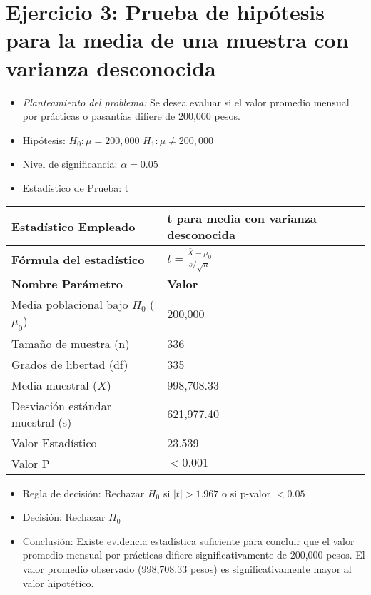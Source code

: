 \documentclass[12pt,a4paper]{article}
\begin{document}
\section*{Ejercicio 3: Prueba de hipótesis para la media de una muestra con varianza desconocida}
\begin{itemize}
    \item \textit{Planteamiento del problema:} Se desea evaluar si el valor promedio mensual por prácticas o pasantías difiere de 200,000 pesos.
    \item Hipótesis: \quad $H_{0}: \mu = 200,000$ \hspace{2cm} $H_{1}: \mu \neq 200,000$
    \item Nivel de significancia: $\alpha = 0.05$
    \item Estadístico de Prueba: t
\end{itemize}

\begin{tabular}{|m{7cm}|m{7cm}|}
\hline
\textbf{Estadístico Empleado} & t para media con varianza desconocida \\ \hline
\textbf{Fórmula del estadístico} & $t = \frac{\bar{X} - \mu_0}{s/\sqrt{n}}$ \\ \hline
\textbf{Nombre Parámetro} & \textbf{Valor} \\ \hline
Media poblacional bajo $H_0$ ($\mu_0$) & 200,000 \\ \hline
Tamaño de muestra (n) & 336 \\ \hline
Grados de libertad (df) & 335 \\ \hline
Media muestral ($\bar{X}$) & 998,708.33 \\ \hline
Desviación estándar muestral (s) & 621,977.40 \\ \hline
Valor Estadístico & 23.539 \\ \hline
Valor P & $< 0.001$ \\ \hline
\end{tabular}

\begin{itemize}
    \item Regla de decisión: Rechazar $H_0$ si $|t| > 1.967$ o si p-valor $< 0.05$
    \item Decisión: Rechazar $H_0$
    \item Conclusión: Existe evidencia estadística suficiente para concluir que el valor promedio mensual por prácticas difiere significativamente de 200,000 pesos. El valor promedio observado (998,708.33 pesos) es significativamente mayor al valor hipotético.
\end{itemize}
\end{document}
